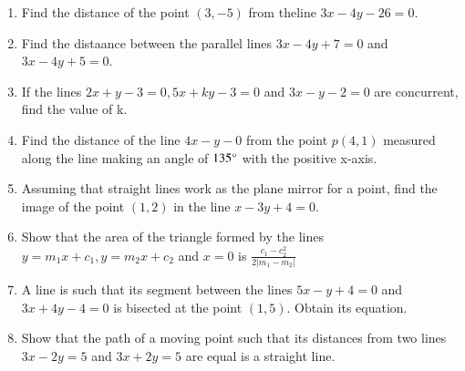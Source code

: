 \documentclass{article}
\theoremstyle{remark}
\begin{document}
\begin{enumerate}
\item Find the distance of the point $(3,-5)$ from theline $3x-4y-26=0$.
\item Find the distaance between the parallel lines $3x-4y+7=0$ and $3x-4y+5=0$.
\item If the lines $2x+y-3=0, 5x+ky-3=0$ and $3x-y-2=0$ are concurrent, find the value of k.
\item Find the distance of the line $4x-y-0$ from the point $p(4,1)$ measured along the line making an angle of $135\degree$ with the positive x-axis.
\item Assuming that straight lines work as the plane mirror for a point, find the image of the point $(1,2)$ in the line $x-3y+4=0$.
\item Show that the area of the triangle formed by the lines $y=m_1x+c_1, y=m_2x+c_2$ and $x=0$ is $\frac{c_1-c_2^2}{2|m_1-m_2|}$
\item A line is such that its segment between the lines $5x-y+4=0$ and $3x+4y-4=0$ is bisected at the point $(1,5)$. Obtain its equation.
\item Show that the path of a moving point such that its distances from two lines $3x-2y=5$ and $3x+2y=5$ are equal is a straight line.
\end{enumerate}
\end{document}
